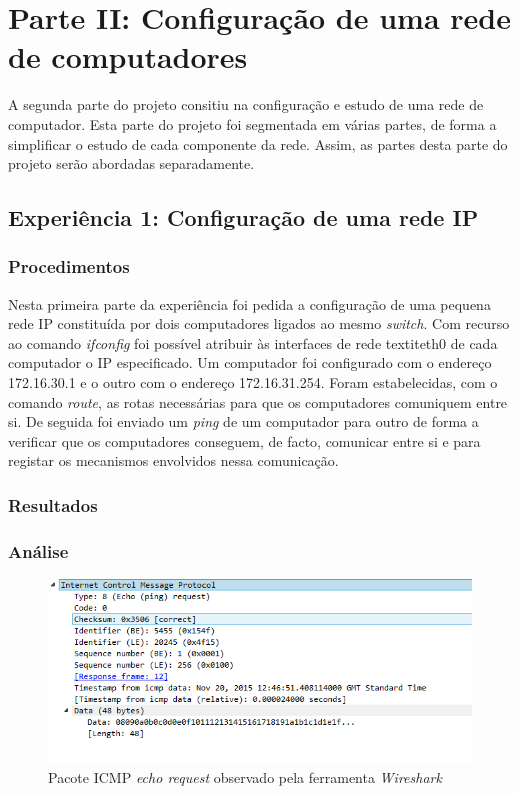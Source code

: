\documentclass{article}
\begin{document}
\newpage

\section{Parte II: Configuração de uma rede de computadores}

A segunda parte do projeto consitiu na configuração e estudo de uma rede de computador. Esta parte do projeto foi segmentada em várias partes, de forma a simplificar o estudo de cada componente da rede. Assim, as partes desta parte do projeto serão abordadas separadamente.

\subsection{Experiência 1: Configuração de uma rede IP}

\subsubsection{Procedimentos}
Nesta primeira parte da experiência foi pedida a configuração de uma pequena rede IP constituída por dois computadores ligados ao mesmo \textit{switch}. Com recurso ao comando \textit{ifconfig} foi possível atribuir às interfaces de rede textit{eth0} de cada computador o IP especificado. Um computador foi configurado com o endereço 172.16.30.1 e o outro com o endereço 172.16.31.254. Foram estabelecidas, com o comando \textit{route}, as rotas necessárias para que os computadores comuniquem entre si.
De seguida foi enviado um \textit{ping} de um computador para outro de forma a verificar que os computadores conseguem, de facto, comunicar entre si e para registar os mecanismos envolvidos nessa comunicação. 
\subsubsection{Resultados}

\subsubsection{Análise}


\begin{figure}
\centering
\includegraphics[width=1.0\textwidth]{icmp_packet.PNG}
\caption{Pacote ICMP \textit{echo request} observado pela ferramenta \textit{Wireshark}}
\label{fig:icmp}
\end{figure}
\end{document}
